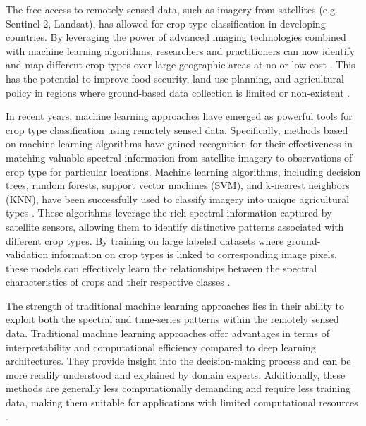 \documentclass[journal]{IEEEtran}
\begin{document}
The free access to remotely sensed data, such as imagery from satellites (e.g. Sentinel-2, Landsat), has allowed for crop type classification in developing countries. By leveraging the power of advanced imaging technologies combined with machine learning algorithms, researchers and practitioners can now identify and map different crop types over large geographic areas at no or low cost \cite{hersh2021open}. This has the potential to improve food security, land use planning, and agricultural policy in regions where ground-based data collection is limited or non-existent \cite{rs10010099, li2023development, ibrahim2021mapping}.

In recent years, machine learning approaches have emerged as powerful tools for crop type classification using remotely sensed data. Specifically, methods based on machine learning algorithms have gained recognition for their effectiveness in matching valuable spectral information from satellite imagery to observations of crop type for particular locations. Machine learning algorithms, including decision trees, random forests, support vector machines (SVM), and k-nearest neighbors (KNN), have been successfully used to  classify imagery into unique agricultural types \cite{@ibrahim2021mapping, begue2018remote, delince2017handbook}. These algorithms leverage the rich spectral information captured by satellite sensors, allowing them to identify distinctive patterns associated with different crop types. By training on large labeled datasets where ground-validation information on crop types is linked to corresponding image pixels, these models can effectively learn the relationships between the spectral characteristics of crops and their respective classes \cite{rs10010099}.

The strength of traditional machine learning approaches lies in their ability to exploit both the spectral and time-series patterns within the remotely sensed data. Traditional machine learning approaches offer advantages in terms of interpretability and computational efficiency compared to deep learning architectures. They provide insight into the decision-making process and can be more readily understood and explained by domain experts. Additionally, these methods are generally less computationally demanding and require less training data, making them suitable for applications with limited computational resources \cite{hohl2024recent, rs13132591, agriculture13050965, LI2023103345, MA2019166}.
 
\end{document}
